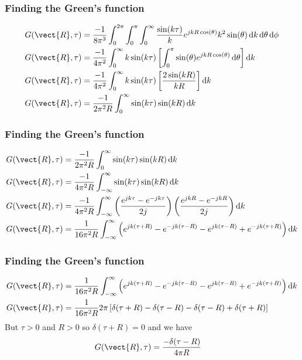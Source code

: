 \documentclass[12 pt, compress, handout, intlimits]{beamer}
\renewcommand{\d}{\operatorname{d}\!}
\begin{document}
\note{}

\begin{frame}[fragile]
    \frametitle{Finding the Green's function}
    
    \begin{align*}
        G(\vect{R},\tau) &= \frac{-1}{8 \pi^3} \int_0^{2 \pi} \int_0^\pi \int_0^\infty \frac{\sin(k \tau)}{k} e^{j k R \cos(\theta)} k^2 \sin(\theta) \d k \d \theta \d \phi
        \\
        G(\vect{R},\tau) &= \frac{-1}{4 \pi^2} \int_0^\infty k \sin(k \tau) \left[ \int_0^\pi \sin(\theta) e^{j k R \cos(\theta)} \d \theta \right] \d k
        \\
        G(\vect{R},\tau) &= \frac{-1}{4 \pi^2} \int_0^\infty k \sin(k \tau) \left[ \frac{2 \sin(k R)}{k R} \right] \d k
        \\
        G(\vect{R},\tau) &= \frac{-1}{2 \pi^2 R} \int_0^\infty \sin(k \tau) \sin(k R) \d k
    \end{align*}
    
\end{frame}

\note{}

\begin{frame}[fragile]
    \frametitle{Finding the Green's function}

    \begin{align*}
        G(\vect{R},\tau) &= \frac{-1}{2 \pi^2 R} \int_0^\infty \sin(k \tau) \sin(k R) \d k
        \\
        G(\vect{R},\tau) &= \frac{-1}{4 \pi^2 R} \int_{-\infty}^\infty \sin(k \tau) \sin(k R) \d k
        \\
        G(\vect{R},\tau) &= \frac{-1}{4 \pi^2 R} \int_{-\infty}^\infty \left( \frac{e^{j k \tau} - e^{-j k \tau}}{2 j}\right) \left( \frac{e^{j k R} - e^{-j k R}}{2j}\right) \d k
        \\
        G(\vect{R},\tau) &= \frac{1}{16 \pi^2 R} \int_{-\infty}^\infty \left( e^{j k (\tau + R)} - e^{-j k (\tau - R)} - e^{j k (\tau - R)} + e^{-j k (\tau + R)} \right) \d k
    \end{align*}
    
\end{frame}

\note{}

\begin{frame}[fragile]
    \frametitle{Finding the Green's function}
    
    \begin{align*}
        G(\vect{R},\tau) &= \frac{1}{16 \pi^2 R} \int_{-\infty}^\infty \left( e^{j k (\tau + R)} - e^{-j k (\tau - R)} - e^{j k (\tau - R)} + e^{-j k (\tau + R)} \right) \d k
        \\
        G(\vect{R},\tau) &= \frac{1}{16 \pi^2 R} 2 \pi \left[ \delta(\tau + R) - \delta(\tau - R) - \delta(\tau - R) + \delta(\tau + R) \right]
    \end{align*}
    But $ \tau > 0 $ and $ R > 0 $ so $ \delta(\tau + R) = 0 $ and we have
    \begin{align*}
        G(\vect{R},\tau) &= \frac{- \delta(\tau - R)}{4 \pi R}
    \end{align*}
    
\end{frame}
\end{document}
